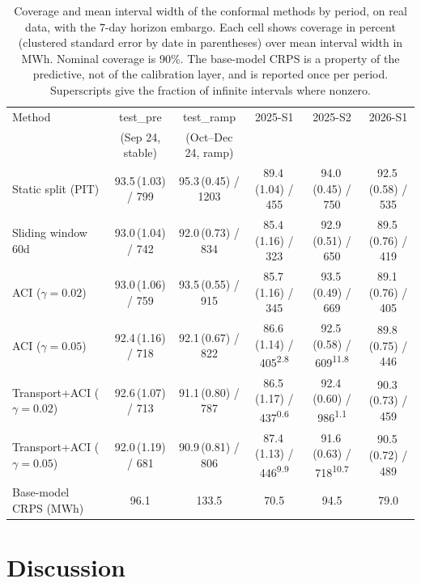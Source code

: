 \documentclass[preprint,3p,times]{elsarticle}
\begin{document}
\begin{table}[t]
\centering
\footnotesize
\caption{Coverage and mean interval width of the conformal methods by period, on real data, with the 7-day horizon embargo. Each cell shows coverage in percent (clustered standard error by date in parentheses) over mean interval width in MWh. Nominal coverage is 90\%. The base-model CRPS is a property of the predictive, not of the calibration layer, and is reported once per period. Superscripts give the fraction of infinite intervals where nonzero.}
\label{tab:results}
\begin{tabular}{lccccc}
\toprule
Method & test\_pre & test\_ramp & 2025-S1 & 2025-S2 & 2026-S1 \\
       & (Sep 24, stable) & (Oct--Dec 24, ramp) & & & \\
\midrule
Static split (PIT)      & 93.5\,(1.03) / 799 & 95.3\,(0.45) / 1203 & 89.4\,(1.04) / 455 & 94.0\,(0.45) / 750 & 92.5\,(0.58) / 535 \\
Sliding window 60d      & 93.0\,(1.04) / 742 & 92.0\,(0.73) / 834  & 85.4\,(1.16) / 323 & 92.9\,(0.51) / 650 & 89.5\,(0.76) / 419 \\
ACI ($\gamma{=}0.02$)   & 93.0\,(1.06) / 759 & 93.5\,(0.55) / 915  & 85.7\,(1.16) / 345 & 93.5\,(0.49) / 669 & 89.1\,(0.76) / 405 \\
ACI ($\gamma{=}0.05$)   & 92.4\,(1.16) / 718 & 92.1\,(0.67) / 822  & 86.6\,(1.14) / 405\textsuperscript{2.8} & 92.5\,(0.58) / 609\textsuperscript{11.8} & 89.8\,(0.75) / 446 \\
Transport+ACI ($\gamma{=}0.02$) & 92.6\,(1.07) / 713 & 91.1\,(0.80) / 787 & 86.5\,(1.17) / 437\textsuperscript{0.6} & 92.4\,(0.60) / 986\textsuperscript{1.1} & 90.3\,(0.73) / 459 \\
Transport+ACI ($\gamma{=}0.05$) & 92.0\,(1.19) / 681 & 90.9\,(0.81) / 806 & 87.4\,(1.13) / 446\textsuperscript{9.9} & 91.6\,(0.63) / 718\textsuperscript{10.7} & 90.5\,(0.72) / 489 \\
\midrule
Base-model CRPS (MWh)   & 96.1 & 133.5 & 70.5 & 94.5 & 79.0 \\
\bottomrule
\end{tabular}
\end{table}

\section{Discussion}
\label{sec:discussion}
\end{document}
